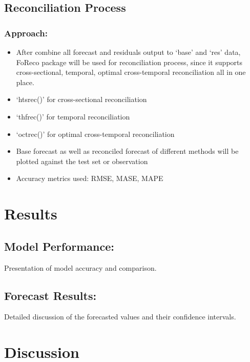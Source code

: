 \documentclass[11pt,a4paper,]{article}
\providecommand{\tightlist}{%
  \setlength{\itemsep}{0pt}\setlength{\parskip}{0pt}}
\begin{document}
\subsection{Reconciliation Process}\label{reconciliation-process}

\subsubsection{Approach:}\label{approach}

\begin{itemize}
\tightlist
\item
  After combine all forecast and residuals output to `base' and `res' data, FoReco package will be used for reconciliation process, since it supports cross-sectional, temporal, optimal cross-temporal reconciliation all in one place.
\item
  `htsrec()' for cross-sectional reconciliation
\item
  `thfrec()' for temporal reconciliation
\item
  `octrec()' for optimal cross-temporal reconciliation
\item
  Base forecast as well as reconciled forecast of different methods will be plotted against the test set or observation
\item
  Accuracy metrics used: RMSE, MASE, MAPE
\end{itemize}

\section{Results}\label{results}

\subsection{Model Performance:}\label{model-performance}

Presentation of model accuracy and comparison.

\subsection{Forecast Results:}\label{forecast-results}

Detailed discussion of the forecasted values and their confidence intervals.

\section{Discussion}\label{discussion}
\end{document}
